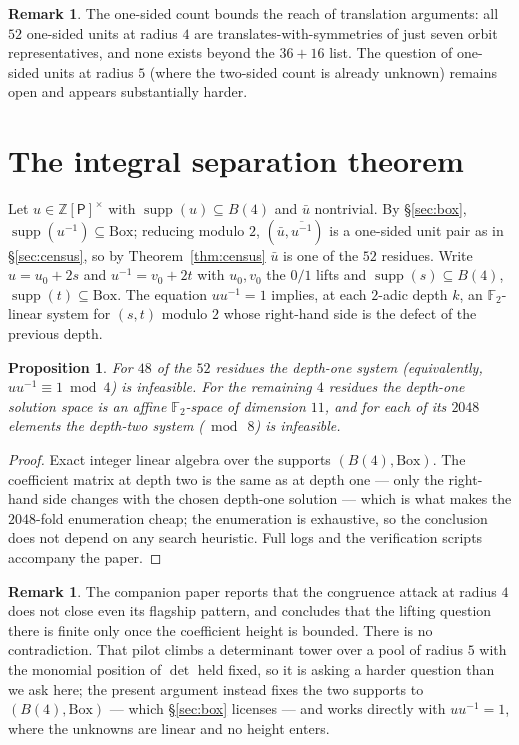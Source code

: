 \documentclass[11pt]{amsart}
\newtheorem{proposition}[theorem]{Proposition}
\theoremstyle{definition}
\newtheorem{remark}[theorem]{Remark}
\newcommand{\F}{\mathbb{F}}
\newcommand{\Z}{\mathbb{Z}}
\renewcommand{\P}{\mathsf{P}}
\newcommand{\Ball}[1]{B(#1)}
\newcommand{\supp}{\operatorname{supp}}
\newcommand{\BOX}{\mathrm{Box}}
\begin{document}
\begin{remark}
The one-sided count bounds the reach of translation arguments: all $52$
one-sided units at radius $4$ are translates-with-symmetries of just seven
orbit representatives, and none exists beyond the $36+16$ list. The question of
one-sided units at radius $5$ (where the two-sided count is already unknown)
remains open and appears substantially harder.
\end{remark}

\section{The integral separation theorem}\label{sec:integral}

Let $u\in\Z[\P]^\times$ with $\supp(u)\subseteq\Ball4$ and $\bar u$ nontrivial.
By \S\ref{sec:box}, $\supp(u^{-1})\subseteq\BOX$; reducing modulo $2$,
$(\bar u,\overline{u^{-1}})$ is a one-sided unit pair as in
\S\ref{sec:census}, so by Theorem~\ref{thm:census} $\bar u$ is one of the $52$
residues. Write $u=u_0+2s$ and $u^{-1}=v_0+2t$ with $u_0,v_0$ the $0/1$ lifts
and $\supp(s)\subseteq\Ball4$, $\supp(t)\subseteq\BOX$. The equation
$uu^{-1}=1$ implies, at each $2$-adic depth $k$, an $\F_2$-linear system for
$(s,t)$ modulo $2$ whose right-hand side is the defect of the previous depth.

\begin{proposition}\label{prop:closures}
For $48$ of the $52$ residues the depth-one system (equivalently,
$uu^{-1}\equiv1\bmod4$) is infeasible. For the remaining $4$ residues the
depth-one solution space is an affine $\F_2$-space of dimension $11$, and for
each of its $2048$ elements the depth-two system ($\bmod\ 8$) is infeasible.
\end{proposition}

\begin{proof}
Exact integer linear algebra over the supports $(\Ball4,\BOX)$. The
coefficient matrix at depth two is the same as at depth one --- only the
right-hand side changes with the chosen depth-one solution --- which is what
makes the $2048$-fold enumeration cheap; the enumeration is exhaustive, so the
conclusion does not depend on any search heuristic. Full logs and the
verification scripts accompany the paper.
\end{proof}

\begin{remark}
The companion paper \cite{Tabei4} reports that the congruence attack at radius
$4$ does not close even its flagship pattern, and concludes that the lifting
question there is finite only once the coefficient height is bounded. There is
no contradiction. That pilot climbs a determinant tower over a pool of radius
$5$ with the monomial position of $\det$ held fixed, so it is asking a harder
question than we ask here; the present argument instead fixes the two supports
to $(\Ball4,\BOX)$ --- which \S\ref{sec:box} licenses --- and works directly
with $uu^{-1}=1$, where the unknowns are linear and no height enters.
\end{remark}
\end{document}
